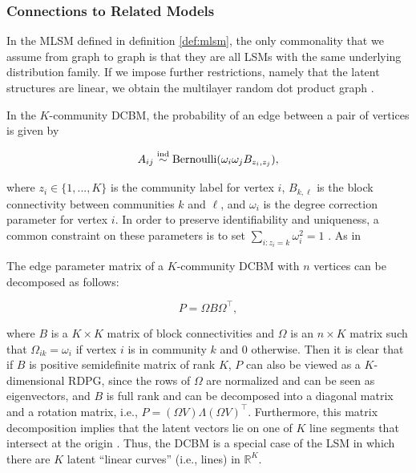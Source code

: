\documentclass[12pt]{article}
\begin{document}
\subsubsection{Connections to Related
Models}\label{connections-to-related-models}

In the MLSM defined in definition \ref{def:mlsm}, the only commonality
that we assume from graph to graph is that they are all LSMs with the
same underlying distribution family. If we impose further restrictions,
namely that the latent structures are linear, we obtain the multilayer
random dot product graph \citep{jones2021multilayer}.

\begin{example}
In the $K$-community DCBM, the probability of an edge between a pair of vertices is given by

$$A_{ij} \stackrel{\mathrm{ind}}{\sim} \mathrm{Bernoulli}(\omega_i \omega_j B_{z_i, z_j}),$$

where $z_i \in \{1, ..., K\}$ is the community label for vertex $i$, $B_{k, \ell}$ is the block connectivity between communities $k$ and $\ell$, and $\omega_i$ is the degree correction parameter for vertex $i$. 
In order to preserve identifiability and uniqueness, a common constraint on these parameters is to set $\sum_{i : z_i = k} \omega_i^2 = 1$ \citep{Karrer_2011}. 
As in 

The edge parameter matrix of a $K$-community DCBM with $n$ vertices can be decomposed as follows:

$$P = \Omega B \Omega^\top,$$

where $B$ is a $K \times K$ matrix of block connectivities and $\Omega$ is an $n \times K$ matrix such that $\Omega_{ik} = \omega_i$ if vertex $i$ is in community $k$ and $0$ otherwise. 
Then it is clear that if $B$ is positive semidefinite matrix of rank $K$, $P$ can also be viewed as a $K$-dimensional RDPG, since the rows of $\Omega$ are normalized and can be seen as eigenvectors, and $B$ is full rank and can be decomposed into a diagonal matrix and a rotation matrix, i.e., $P = (\Omega V) \Lambda (\Omega V)^\top$. 
Furthermore, this matrix decomposition implies that the latent vectors lie on one of $K$ line segments that intersect at the origin \citep{rubindelanchy2017statistical}. 
Thus, the DCBM is a special case of the LSM in which there are $K$ latent ``linear curves'' (i.e., lines) in $\mathbb{R}^K$. 


\end{example}
\end{document}
